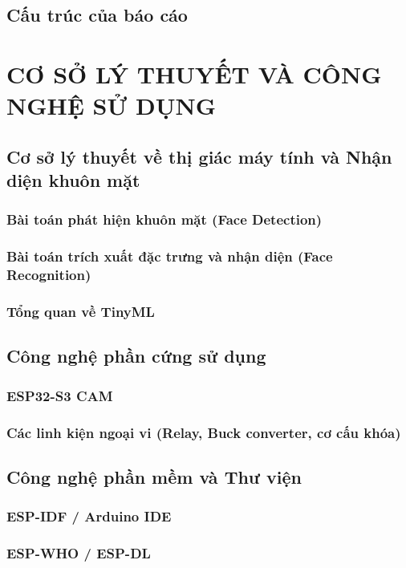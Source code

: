 \documentclass[12pt,a4paper]{report}
\begin{document}
    \section{Cấu trúc của báo cáo}

    \chapter{CƠ SỞ LÝ THUYẾT VÀ CÔNG NGHỆ SỬ DỤNG}
    \section{Cơ sở lý thuyết về thị giác máy tính và Nhận diện khuôn mặt}
    \subsection{Bài toán phát hiện khuôn mặt (Face Detection)}
    \subsection{Bài toán trích xuất đặc trưng và nhận diện (Face Recognition)}
    \subsection{Tổng quan về TinyML}

    \section{Công nghệ phần cứng sử dụng}
    \subsection{ESP32-S3 CAM}
    \subsection{Các linh kiện ngoại vi (Relay, Buck converter, cơ cấu khóa)}

    \section{Công nghệ phần mềm và Thư viện}
    \subsection{ESP-IDF / Arduino IDE}
    \subsection{ESP-WHO / ESP-DL}
\end{document}
